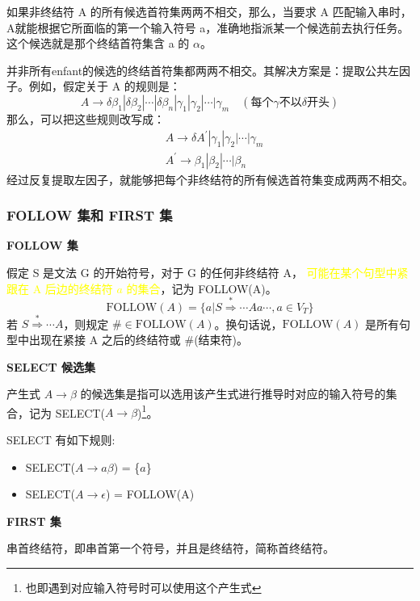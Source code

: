 如果非终结符 A 的所有候选首符集两两不相交，那么，当要求 A 匹配输入串时，A就能根据它所面临的第一个输入符号 a，准确地指派某一个候选前去执行任务。这个候选就是那个终结首符集含 a 的 $\alpha$。

并非所有enfant的候选的终结首符集都两两不相交。其解决方案是：提取公共左因子。例如，假定关于 A 的规则是：
\[ A \rightarrow \delta \beta_1 | \delta \beta_2 | \cdots | \delta \beta_n | \gamma_1 | \gamma_2 | \cdots | \gamma_m \quad (\text{每个} \gamma \text{不以} \delta \text{开头}) \]
那么，可以把这些规则改写成：
\begin{equation}
    \begin{aligned}
         & A \rightarrow \delta A^{'} | \gamma_1 | \gamma_2 | \cdots | \gamma_m \\
         & A^{'} \rightarrow \beta_1 | \beta_2 | \cdots | \beta_n \nonumber
    \end{aligned}
\end{equation}
经过反复提取左因子，就能够把每个非终结符的所有候选首符集变成两两不相交。

\subsubsection{\textcolor{imp}{FOLLOW 集和 FIRST 集}}

\noindent\textbf{\textcolor{imp}{FOLLOW 集}}

假定 S 是文法 G 的开始符号，对于 G 的任何非终结符 A， \textcolor{mark}{可能在某个句型中紧跟在 A 后边的终结符 $a$ 的集合}，记为 FOLLOW(A)。
\[ \text{FOLLOW}(A) = \{ a|S\stackrel{*}{\Rightarrow} \cdots Aa \cdots, a\in V_T \} \]
若 $S\stackrel{*}{\Rightarrow} \cdots A$，则规定 $\# \in \text{FOLLOW}(A)$。换句话说，$\text{FOLLOW}(A)$ 是所有句型中出现在紧接 A 之后的终结符或 \#(结束符)。

\noindent\textbf{SELECT 候选集}

产生式 $A \rightarrow \beta$ 的候选集是指可以选用该产生式进行推导时对应的输入符号的集合，记为 SELECT($A \rightarrow \beta$)\footnote{也即遇到对应输入符号时可以使用这个产生式}。

SELECT 有如下规则:
\begin{itemize}
    \item SELECT($A \rightarrow a\beta$) = \{$a$\}
    \item SELECT($A \rightarrow \epsilon$) = FOLLOW(A)
\end{itemize}

\noindent\textbf{\textcolor{imp}{FIRST 集}}

串首终结符，即串首第一个符号，并且是终结符，简称首终结符。


